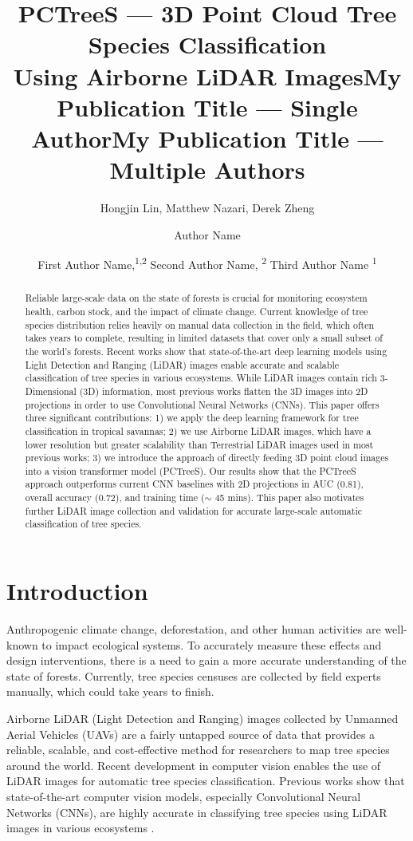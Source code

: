 \documentclass[letterpaper]{article} %
\title{PCTreeS --- 3D Point Cloud Tree Species Classification \\Using Airborne LiDAR Images}
\author{
    Hongjin Lin\equalcontrib,
    Matthew Nazari\equalcontrib,
    Derek Zheng\equalcontrib
}
\title{My Publication Title --- Single Author}
\author {
    Author Name
}
\title{My Publication Title --- Multiple Authors}
\author {
    First Author Name,\textsuperscript{\rm 1,\rm 2}
    Second Author Name, \textsuperscript{\rm 2}
    Third Author Name \textsuperscript{\rm 1}
}
\begin{document}
\maketitle

\begin{abstract}

Reliable large-scale data on the state of forests is crucial for monitoring ecosystem health, carbon stock, and the impact of climate change. Current knowledge of tree species distribution relies heavily on manual data collection in the field, which often takes years to complete, resulting in limited datasets that cover only a small subset of the world’s forests. Recent works show that state-of-the-art deep learning models using Light Detection and Ranging (LiDAR) images enable accurate and scalable classification of tree species in various ecosystems. While LiDAR images contain rich 3-Dimensional (3D) information, most previous works flatten the 3D images into 2D projections in order to use Convolutional Neural Networks (CNNs). This paper offers three significant contributions: 1) we apply the deep learning framework for tree classification in tropical savannas; 2) we use Airborne LiDAR images, which have a lower resolution but greater scalability than Terrestrial LiDAR images used in most previous works; 3) we introduce the approach of directly feeding 3D point cloud images into a vision transformer model (PCTreeS). Our results show that the PCTreeS approach outperforms current CNN baselines with 2D projections in AUC (0.81), overall accuracy (0.72), and training time ($\sim$ 45 mins). This paper also motivates further LiDAR image collection and validation for accurate large-scale automatic classification of tree species.
\end{abstract}

\section{Introduction}

Anthropogenic climate change, deforestation, and other human activities are well-known to impact ecological systems. To accurately measure these effects and design interventions, there is a need to gain a more accurate understanding of the state of forests. Currently, tree species censuses are collected by field experts manually, which could take years to finish. 

Airborne LiDAR (Light Detection and Ranging) images collected by Unmanned Aerial Vehicles (UAVs) are a fairly untapped source of data that provides a reliable, scalable, and cost-effective method for researchers to map tree species around the world. Recent development in computer vision enables the use of LiDAR images for automatic tree species classification. Previous works show that state-of-the-art computer vision models, especially Convolutional Neural Networks (CNNs), are highly accurate in classifying tree species using LiDAR images in various ecosystems \cite{zou2017tree, xi2020see, terryn2020tree, seidel2021predicting, allen, BUDEI2018632, HAMRAZ2019219, MAYRA2021112322, Hell2022}. 
\end{document}
